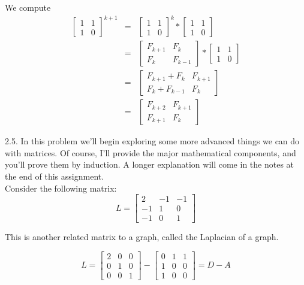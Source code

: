 \documentclass[16 pt]{amsart}
\theoremstyle{definition}
\theoremstyle{remark}
\numberwithin{equation}{subsection}
\begin{document}
We compute
\begin{eqnarray}
\begin{bmatrix}
1 & 1\\
1 & 0
\end{bmatrix}^{k+1} 
& = & 
\begin{bmatrix}
1 & 1\\
1 & 0
\end{bmatrix}^{k} *
\begin{bmatrix}
1 & 1\\
1 & 0
\end{bmatrix} \nonumber\\
& = & 
\begin{bmatrix}
F_{k+1} & F_k\\
F_k & F_{k-1}
\end{bmatrix} * 
\begin{bmatrix}
1 & 1\\
1 & 0
\end{bmatrix} \nonumber \\
& = &
\begin{bmatrix}
F_{k+1} + F_k & F_{k+1}\\
F_k + F_{k-1 }& F_{k}
\end{bmatrix}   \nonumber \\
& = & 
\begin{bmatrix}
F_{k+2} & F_{k+1}\\
F_{k+1} & F_{k}
\end{bmatrix} 
\end{eqnarray}




2.5.  In this problem we'll begin exploring some more advanced things we can do with matrices.  Of course, I'll provide the major mathematical components, and you'll prove them by induction.  A longer explanation will come in the notes at the end of this assignment.\\


Consider the following matrix:
\[
L = \begin{bmatrix}
2 & -1 & -1 \\
-1 & 1 & 0\\
-1 & 0 & 1
\end{bmatrix}
\]

This is another related matrix to a graph, called the Laplacian of a graph.

\[
L = \begin{bmatrix}
2 & 0 & 0\\
0 & 1 & 0\\
0 & 0 & 1
\end{bmatrix} - \begin{bmatrix}
0 & 1 & 1\\
1 & 0 & 0\\
1 & 0 & 0
\end{bmatrix} = D-A
\]
\end{document}
